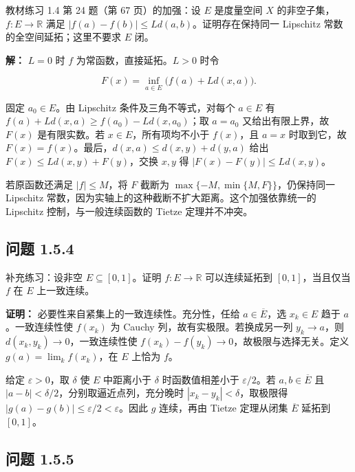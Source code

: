 \documentclass[11pt,a4paper]{article}
\begin{document}
教材练习 1.4 第 24 题（第 67 页）的加强：设 \(E\) 是度量空间 \(X\)
的非空子集，\(f:E\to\mathbb R\) 满足
\(|f(a)-f(b)|\le Ld(a,b)\)。证明存在保持同一 Lipschitz
常数的全空间延拓；这里不要求 \(E\) 闭。

\textbf{解：} \(L=0\) 时 \(f\) 为常函数，直接延拓。\(L>0\) 时令

\begin{equation*}
F(x)=\inf_{a\in E}\bigl(f(a)+Ld(x,a)\bigr).
\tag{1.5.21}
\end{equation*}

固定 \(a_0\in E\)。由 Lipschitz 条件及三角不等式，对每个 \(a\in E\) 有
\(f(a)+Ld(x,a)\ge f(a_0)-Ld(x,a_0)\)；取 \(a=a_0\) 又给出有限上界，故
\(F(x)\) 是有限实数。若 \(x\in E\)，所有项均不小于 \(f(x)\)，且 \(a=x\)
时取到它，故 \(F(x)=f(x)\)。最后，\(d(x,a)\le d(x,y)+d(y,a)\) 给出
\(F(x)\le Ld(x,y)+F(y)\)，交换 \(x,y\) 得 \(|F(x)-F(y)|\le Ld(x,y)\)。

若原函数还满足 \(|f|\le M\)，将 \(F\) 截断为
\(\max\{-M,\min\{M,F\}\}\)，仍保持同一 Lipschitz
常数，因为实轴上的这种截断不扩大距离。这个加强依靠统一的 Lipschitz
控制，与一般连续函数的 Tietze 定理并不冲突。

\subsection{问题 1.5.4}\label{ux95eeux9898-1.5.4}

补充练习：设非空 \(E\subseteq[0,1]\)。证明 \(f:E\to\mathbb R\)
可以连续延拓到 \([0,1]\)，当且仅当 \(f\) 在 \(E\) 上一致连续。

\textbf{证明：} 必要性来自紧集上的一致连续性。充分性，任给
\(a\in\overline E\)，选 \(x_k\in E\) 趋于 \(a\)。一致连续性使 \(f(x_k)\)
为 Cauchy 列，故有实极限。若换成另一列 \(y_k\to a\)，则
\(d(x_k,y_k)\to0\)，一致连续性使
\(f(x_k)-f(y_k)\to0\)，故极限与选择无关。定义 \(g(a)=\lim_kf(x_k)\)，在
\(E\) 上恰为 \(f\)。

给定 \(\varepsilon>0\)，取 \(\delta\) 使 \(E\) 中距离小于 \(\delta\)
时函数值相差小于 \(\varepsilon/2\)。若 \(a,b\in\overline E\) 且
\(|a-b|<\delta/2\)，分别取逼近点列，充分晚时
\(|x_k-y_k|<\delta\)，取极限得
\(|g(a)-g(b)|\le\varepsilon/2<\varepsilon\)。因此 \(g\) 连续，再由
Tietze 定理从闭集 \(\overline E\) 延拓到 \([0,1]\)。

\subsection{问题 1.5.5}\label{ux95eeux9898-1.5.5}
\end{document}
